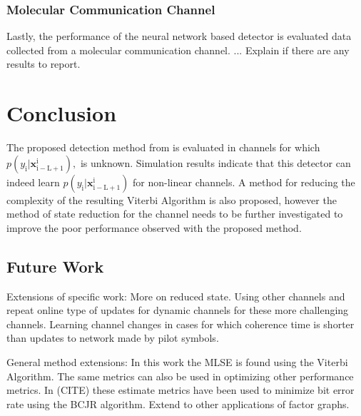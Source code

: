\documentclass[12pt,a4paper]{article}
\begin{document}
\subsubsection{Molecular Communication Channel}
Lastly, the performance of the neural network based detector is evaluated data collected from a molecular communication channel. ... Explain if there are any results to report. 

\section{Conclusion}
The proposed detection method from \cite{shlezinger2019viterbinet} is evaluated in  channels for which $p(y_{\mathrm{i}}|\mathbf{x}_{\mathrm{i-L+1}}^{\mathrm{i}}),$ is unknown. Simulation results indicate that this detector can indeed learn
$p(y_{\mathrm{i}}|\mathbf{x}_{\mathrm{i-L+1}}^{\mathrm{i}})$ for non-linear channels. A method for reducing the complexity of the resulting Viterbi Algorithm is also proposed, however the method of state reduction for the channel needs to be further investigated to improve the poor performance observed with the proposed method. 


\subsection{Future Work}

Extensions of specific work: 
More on reduced state.
Using other channels and repeat online type of updates for dynamic channels for these more challenging channels. 
Learning channel changes in cases for which coherence time is shorter than updates to network made by pilot symbols. 

General method extensions:
In this work the MLSE is found using the Viterbi Algorithm. The same metrics can also be used in optimizing other performance metrics. In (CITE) these estimate metrics have been used to minimize bit error rate using the BCJR algorithm. Extend to other applications of factor graphs. 

\newpage
{}
\end{document}
